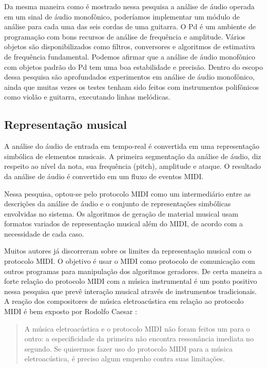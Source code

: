 \documentclass[draft]{ppgmus}
\begin{document}
Da mesma maneira como é mostrado nessa pesquisa a análise de áudio operada em um sinal de áudio
monofônico, poderíamos implementar um módulo de análise para cada uma das seis cordas de uma guitarra.
O Pd é um ambiente de programação com bons recursos de análise de frequência e amplitude. Vários
objetos são disponibilizados como filtros, conversores e algoritmos de estimativa de frequência fundamental.
Podemos afirmar que a análise de áudio monofônico com objetos padrão do Pd tem uma boa estabilidade e
precisão. Dentro do escopo dessa pesquisa são aprofundados experimentos em análise de áudio monofônico,
ainda que muitas vezes os testes tenham sido feitos com instrumentos polifônicos como violão e 
guitarra, executando linhas melódicas.


 
\subsection{Representação musical}

A análise do áudio de entrada em tempo-real é convertida em uma representação simbólica de 
elementos musicais. A primeira segmentação da análise
de áudio, diz respeito ao nível da nota, sua frequência (pitch),
amplitude e ataque. O resultado da análise de áudio é convertido
em um fluxo de eventos MIDI.

Nessa pesquisa, optou-se pelo protocolo MIDI como um intermediário
entre as descrições da análise de áudio e o conjunto de representações
simbólicas envolvidas no sistema. Os algoritmos de geração
de material musical usam formatos variados de representação musical 
além do MIDI, de acordo com a necessidade de cada caso.

Muitos autores já discorreram sobre os limites da representação musical
com o protocolo MIDI. O objetivo é usar o MIDI como protocolo de comunicação
com outros programas para manipulação dos algoritmos geradores.
De certa maneira a forte relação do protocolo MIDI com a música instrumental
é um ponto positivo nessa pesquisa que prevê interação musical através de 
instrumentos tradicionais. 
A reação dos compositores de música eletroacústica em relação ao protocolo MIDI
é bem exposto por Rodolfo Caesar :

\begin{quote}
A música eletroacústica e o protocolo MIDI não foram feitos um para o outro: a especificidade da 
primeira não encontra ressonância imediata no segundo. Se quisermos fazer uso do protocolo MIDI 
para a música eletroacústica, é preciso algum empenho contra suas limitações. \cite{caesarcopa} 
\end{quote}
\end{document}
